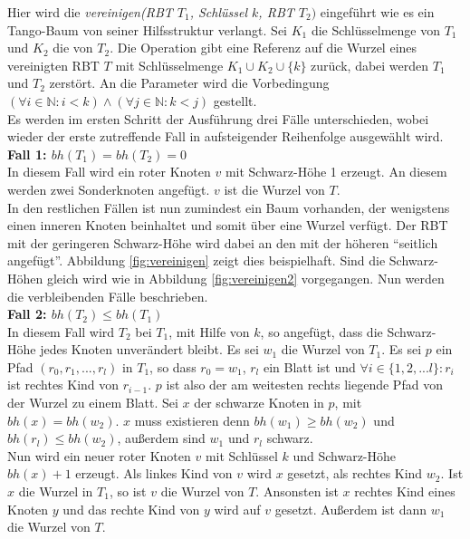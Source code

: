 \documentclass[a4paper,12pt]{article}
\begin{document}
\noindent Hier wird die \textit{vereinigen(RBT $T_1$, Schlüssel $k$, RBT $T_2)$} eingeführt wie es ein Tango-Baum von seiner Hilfsstruktur verlangt. Sei $K_1$ die Schlüsselmenge von $T_1$ und $K_2$ die von $T_2$. Die Operation gibt eine Referenz auf die Wurzel eines vereinigten RBT $T$ mit Schlüsselmenge $K_1 \cup K_2 \cup \{k\} $ zurück, dabei werden $T_1$ und $T_2$ zerstört. An die Parameter wird die Vorbedingung $(\forall i \in \mathbb{N}: i < k ) \land (\forall j \in \mathbb{N}: k < j )$ gestellt.\\
 Es werden im ersten Schritt der Ausführung drei Fälle unterschieden, wobei wieder der erste zutreffende Fall in aufsteigender Reihenfolge ausgewählt wird. \\
\noindent\textbf{Fall 1: $bh(T_1) = bh(T_2) = 0$ }\\   
In diesem Fall wird ein roter Knoten $v$ mit Schwarz-Höhe 1 erzeugt. An diesem werden zwei Sonderknoten angefügt. $v$ ist die Wurzel von $T$. \\
In den restlichen Fällen ist nun zumindest ein Baum vorhanden, der wenigstens einen inneren Knoten beinhaltet und somit über eine Wurzel verfügt. Der RBT mit der geringeren Schwarz-Höhe wird dabei an den mit der höheren \enquote{seitlich angefügt}. Abbildung \ref{fig:vereinigen} zeigt dies beispielhaft. Sind die Schwarz-Höhen gleich wird wie in Abbildung \ref{fig:vereinigen2} vorgegangen. Nun werden die verbleibenden Fälle beschrieben.\\
\noindent\textbf{Fall 2: $bh(T_2) \leq bh(T_1)$ }\\
In diesem Fall wird $T_2$ bei $T_1$, mit Hilfe von $k$, so angefügt, dass die Schwarz-Höhe jedes Knoten unverändert bleibt. Es sei $w_1$ die Wurzel von $T_1$. Es sei $p$ ein Pfad $(r_0,r_1,...,r_l)$ in $T_1$, so dass $r_0 = w_1$, $r_l$ ein Blatt ist und $\forall i \in \{1,2,...l\} \colon r_i$  ist rechtes Kind von  $r_{i-1}$. $p$ ist also der am weitesten rechts liegende Pfad von der Wurzel zu einem Blatt. Sei $x$ der schwarze Knoten in $p$, mit $\mathit{bh}(x) = \mathit{bh}(w_2)$. $x$ muss existieren denn $\mathit{bh}(w_1) \geq \mathit{bh}(w_2)$ und $\mathit{bh}(r_l) \leq  \mathit{bh}(w_2)$, außerdem sind $w_1$ und $r_l$ schwarz.\\
 Nun wird ein neuer roter Knoten $v$ mit Schlüssel $k$ und Schwarz-Höhe $\mathit{bh}(x) + 1$ erzeugt. Als linkes Kind von $v$  wird $x$ gesetzt, als rechtes Kind $w_2$. Ist $x$ die Wurzel in $T_1$, so ist $v$ die Wurzel von $T$. Ansonsten ist $x$ rechtes Kind eines Knoten $y$ und das rechte Kind von $y$ wird auf $v$ gesetzt. Außerdem ist dann $w_1$ die Wurzel von $T$.     \\  
\end{document}
